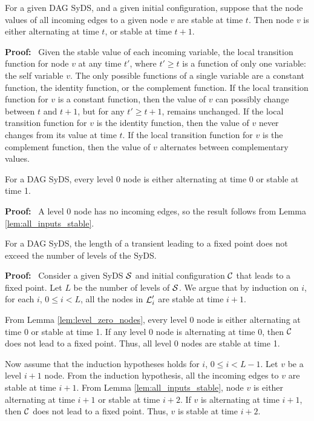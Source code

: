\smallskip

\begin{lemma}\label{lem:all_inputs_stable}
For a given DAG SyDS, and a given initial configuration, suppose
that the node values of all incoming edges to a given node $v$ are
stable at time $t$.  Then node $v$ is either alternating at time
$t$, or stable at time $t+1$.
\end{lemma}

\noindent
\textbf{Proof:}~ 
Given the stable value of each incoming variable, the local transition
function for node $v$ at any time $t'$, where $t' \geq t$ is a
function of only one variable: the self variable $v$.  The only
possible functions of a single variable are a constant function,
the identity function, or the complement function.  If the local
transition function for $v$ is a constant function, then the value
of $v$ can possibly change between $t$ and $t+1$, but for any $t'
\geq t+1$, remains unchanged.  If the local transition function for
$v$ is the identity function, then the value of $v$ never changes
from its value at time $t$.  If the local transition function for
$v$ is the complement function, then the value of $v$ alternates
between complementary values.  \QED

\begin{lemma}\label{lem:level_zero_nodes}
For a DAG SyDS, every level 0 node is either alternating at time 0 or stable at time 1.
\end{lemma}
\noindent
\textbf{Proof:}~ 
 A level 0 node has no incoming edges,
so the result follows from Lemma \ref{lem:all_inputs_stable}.
\QED

\begin{theorem}\label{thm:transient_fixed_point}
For a DAG SyDS,
the length of a transient leading to a fixed point does not exceed the number of levels of the SyDS.
\end{theorem}
\noindent
\textbf{Proof:}~ 
Consider a given SyDS $\mbox{$\mathcal{S}$}$ and initial configuration $\mbox{$\mathcal{C}$}$ that leads to a fixed point.
Let $L$ be the number of levels of $\mbox{$\mathcal{S}$}$.
We argue that by induction on $i$, for each $i$, $0 \leq i < L$,
all the nodes in $\mbox{$\mathcal{L}$}_i'$ are stable at time $i+1$.

From Lemma \ref{lem:level_zero_nodes},
every level 0 node is either alternating at time 0 or stable at time 1.
If any level 0 node is alternating at time 0, then $\mbox{$\mathcal{C}$}$ does not lead to a fixed point.
Thus, all level 0 nodes are stable at time 1.

Now assume that the induction hypotheses holds for $i$, $0 \leq i < L-1$.
Let $v$ be a level $i+1$ node.
From the induction hypothesis, all the incoming edges to $v$ are stable at time $i+1$.
From Lemma \ref{lem:all_inputs_stable},
node $v$ is either alternating at time $i+1$ or stable at time $i+2$.
If $v$ is alternating at time $i+1$, then $\mbox{$\mathcal{C}$}$ does not lead to a fixed point.
Thus, $v$ is stable at time $i+2$.

